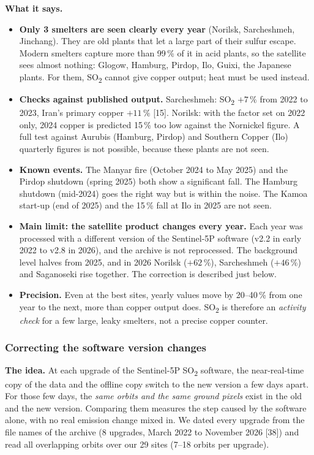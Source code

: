\documentclass[10pt,a4paper]{article}
\newcommand{\SOtwo}{SO\textsubscript{2}}
\begin{document}
\textbf{What it says.}
\begin{itemize}[leftmargin=1.2em]
  \item \textbf{Only 3 smelters are seen clearly every year} (Norilsk, Sarcheshmeh, Jinchang). They are old plants that let a large part of their sulfur escape. Modern smelters capture more than 99\,\% of it in acid plants, so the satellite sees almost nothing: Glogow, Hamburg, Pirdop, Ilo, Guixi, the Japanese plants. For them, \SOtwo{} cannot give copper output; heat must be used instead.
  \item \textbf{Checks against published output.} Sarcheshmeh: \SOtwo{} $+7\,\%$ from 2022 to 2023, Iran's primary copper $+11\,\%$ [15]. Norilsk: with the factor set on 2022 only, 2024 copper is predicted 15\,\% too low against the Nornickel figure. A full test against Aurubis (Hamburg, Pirdop) and Southern Copper (Ilo) quarterly figures is not possible, because these plants are not seen.
  \item \textbf{Known events.} The Manyar fire (October 2024 to May 2025) and the Pirdop shutdown (spring 2025) both show a significant fall. The Hamburg shutdown (mid-2024) goes the right way but is within the noise. The Kamoa start-up (end of 2025) and the 15\,\% fall at Ilo in 2025 are not seen.
  \item \textbf{Main limit: the satellite product changes every year.} Each year was processed with a different version of the Sentinel-5P software (v2.2 in early 2022 to v2.8 in 2026), and the archive is not reprocessed. The background level halves from 2025, and in 2026 Norilsk ($+62\,\%$), Sarcheshmeh ($+46\,\%$) and Saganoseki rise together. The correction is described just below.
  \item \textbf{Precision.} Even at the best sites, yearly values move by 20--40\,\% from one year to the next, more than copper output does. \SOtwo{} is therefore an \emph{activity check} for a few large, leaky smelters, not a precise copper counter.
\end{itemize}

\subsubsection*{Correcting the software version changes}
\textbf{The idea.} At each upgrade of the Sentinel-5P \SOtwo{} software, the near-real-time copy of the data and the offline copy switch to the new version a few days apart. For those few days, the \emph{same orbits and the same ground pixels} exist in the old and the new version. Comparing them measures the step caused by the software alone, with no real emission change mixed in. We dated every upgrade from the file names of the archive (8 upgrades, March 2022 to November 2026 [38]) and read all overlapping orbits over our 29 sites (7--18 orbits per upgrade).
\end{document}
